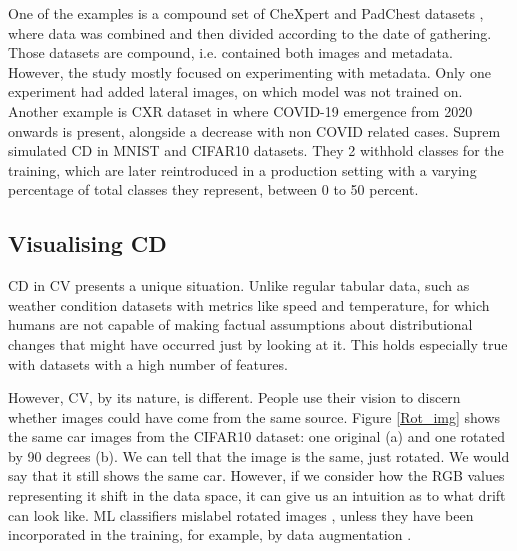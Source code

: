 \documentclass[a4paper]{article}
\begin{document}
One of the examples is a compound set of CheXpert and PadChest datasets \cite{soin_chexstray_2022}, where data was combined and then divided according to the date of gathering. Those datasets are compound, i.e. contained both images and metadata. However, the study mostly focused on experimenting with metadata. Only one experiment had added lateral images, on which model was not trained on. \\

Another example is CXR dataset \cite{kore_empirical_2024} in where COVID-19 emergence from 2020 onwards is present, alongside a decrease with non COVID related cases. Suprem \cite{suprem_odin_2020} simulated CD in MNIST and CIFAR10 datasets. They 2 withhold classes for the training, which are later reintroduced in a production setting with a varying percentage of total classes they represent, between 0 to 50 percent. 

\subsection{Visualising CD}



CD in CV presents a unique situation. Unlike regular tabular data, such as weather condition datasets with metrics like speed and temperature, for which humans are not capable of making factual assumptions about distributional changes that might have occurred just by looking at it. This holds especially true with datasets with a high number of features.

However, CV, by its nature, is different. People use their vision to discern whether images could have come from the same source. Figure \ref{Rot_img} shows the same car images from the CIFAR10 dataset: one original (a) and one rotated by 90 degrees (b). We can tell that the image is the same, just rotated. We would say that it still shows the same car. However, if we consider how the RGB values representing it shift in the data space, it can give us an intuition as to what drift can look like. ML classifiers mislabel rotated images \cite{cheng_learning_2016}, unless they have been incorporated in the training, for example, by data augmentation \cite{shorten_survey_2019}.
\end{document}
